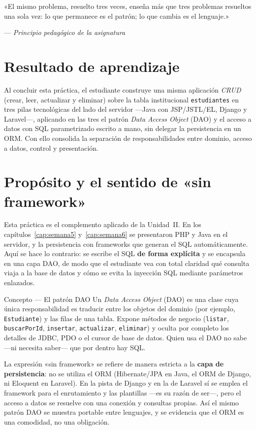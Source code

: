 \documentclass[11pt,a4paper,openany]{book}
\begin{document}
\epigraph{«El mismo problema, resuelto tres veces, enseña más que tres
problemas resueltos una sola vez: lo que permanece es el patrón; lo que
cambia es el lenguaje.»}{--- \textit{Principio pedagógico de la
asignatura}}

\section*{Resultado de aprendizaje}
Al concluir esta práctica, el estudiante construye una misma aplicación
\emph{CRUD} (crear, leer, actualizar y eliminar) sobre la tabla
institucional \texttt{estudiantes} en tres pilas tecnológicas del lado
del servidor ---Java con JSP/JSTL/EL, Django y Laravel---, aplicando en
las tres el patrón \emph{Data Access Object} (DAO) y el acceso a datos
con SQL parametrizado escrito a mano, sin delegar la persistencia en un
ORM. Con ello consolida la separación de responsabilidades entre
dominio, acceso a datos, control y presentación.

\section{Propósito y el sentido de «sin framework»}
\label{ap:crud:proposito}

Esta práctica es el complemento aplicado de la Unidad~II. En los
capítulos~\ref{cap:semana5} y~\ref{cap:semana6} se presentaron PHP y
Java en el servidor, y la persistencia con frameworks que generan el
SQL automáticamente. Aquí se hace lo contrario: se escribe el SQL
\textbf{de forma explícita} y se encapsula en una capa DAO, de modo que
el estudiante vea con total claridad qué consulta viaja a la base de
datos y cómo se evita la inyección SQL mediante parámetros enlazados.

\begin{cajadefinicion}{Concepto --- El patrón DAO}
Un \emph{Data Access Object} (DAO) es una clase cuya única
responsabilidad es traducir entre los objetos del dominio (por ejemplo,
\texttt{Estudiante}) y las filas de una tabla. Expone métodos de
negocio (\texttt{listar}, \texttt{buscarPorId}, \texttt{insertar},
\texttt{actualizar}, \texttt{eliminar}) y oculta por completo los
detalles de JDBC, PDO o el cursor de base de datos. Quien usa el DAO no
sabe ---ni necesita saber--- que por dentro hay SQL.
\end{cajadefinicion}

La expresión «sin framework» se refiere de manera estricta a la
\textbf{capa de persistencia}: no se utiliza el ORM (Hibernate/JPA en
Java, el ORM de Django, ni Eloquent en Laravel). En la pista de Django
y en la de Laravel sí se emplea el framework para el enrutamiento y las
plantillas ---es su razón de ser---, pero el acceso a datos se resuelve
con una conexión y consultas propias. Así el mismo patrón DAO se
muestra portable entre lenguajes, y se evidencia que el ORM es una
comodidad, no una obligación.
\end{document}
